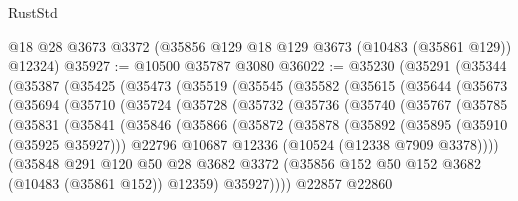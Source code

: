 \begin{lexlean}{RustStd}
\begin{coremodule}
    @18
    @28
    @3673
    @3372
    (@35856 @129 @18 @129 @3673 (@10483 (@35861 @129)) @12324)
@35927 := @10500 @35787 @3080
@36022 := @35230
    (@35291
      (@35344
        (@35387
          (@35425
            (@35473
              (@35519
                (@35545
                  (@35582
                    (@35615
                      (@35644
                        (@35673
                          (@35694
                            (@35710
                              (@35724
                                (@35728
                                  (@35732
                                    (@35736
                                      (@35740
                                        (@35767
                                          (@35785
                                            (@35831
                                              (@35841
                                                (@35846
                                                  (@35866
                                                    (@35872
                                                      (@35878
                                                        (@35892
                                                          (@35895 (@35910 (@35925 @35927)))
                                                          @22796
                                                          @10687
                                                          @12336
                                                          (@10524 (@12338 @7909 @3378))))
                                                      (@35848
                                                        @291
                                                        @120
                                                        @50
                                                        @28
                                                        @3682
                                                        @3372
                                                        (@35856
                                                          @152
                                                          @50
                                                          @152
                                                          @3682
                                                          (@10483 (@35861 @152))
                                                          @12359)
                                                        @35927))))
                                                @22857
                                                @22860

\end{coremodule}
\end{lexlean}

